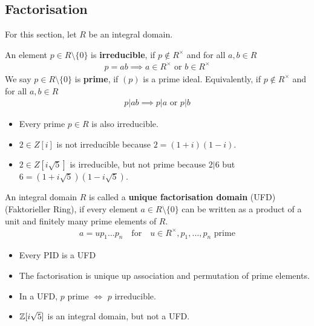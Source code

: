\subsection{Factorisation}
For this section, let $R$ be an integral domain.

\begin{dfn}[]
An element $p \in R \setminus \{0\}$ is \textbf{irreducible}, if $p \notin R^{\times}$ and for all $a,b \in R$
\begin{align*}
  p = ab \implies a \in R^{\times} \text{ or } b \in R^{\times}
\end{align*}
We say $p \in R \setminus \{0\}$ is \textbf{prime}, if $(p)$ is a prime ideal.
Equivalently, if $p \notin R^{\times}$ and for all $a,b \in R$
\begin{align*}
  p | ab \implies p|a \text{ or } p|b
\end{align*}
\end{dfn}
\begin{itemize}
  \item Every prime $p \in R$ is also irreducible.
  \item $2 \in Z[i]$ is not irreducible because $2 = (1+i)(1-i)$.
  \item $2 \in Z[i \sqrt{5}]$ is irreducible, but not prime because $2|6$ but $6 = (1 + i \sqrt{5})(1 - i \sqrt{5})$.
\end{itemize}



\begin{dfn}[]
  An integral domain $R$ is called a \textbf{unique factorisation domain} (UFD) (Faktorieller Ring), if every element $a \in R \setminus \{0\}$ can be written as a product of a unit and finitely many prime elements of $R$.
  \begin{align*}
    a = u p_1 \dots p_n \quad \text{for} \quad u \in R^{\times}, p_1,\ldots,p_n \text{ prime}
  \end{align*}
\end{dfn}
\begin{itemize}
  \item Every PID is a UFD
  \item The factorisation is unique up association and permutation of prime elements.
  \item In a UFD, $p$ prime $\iff$ $p$ irreducible.
  \item $\mathbb{Z}[i \sqrt{5}]$ is an integral domain, but not a UFD.
\end{itemize}


